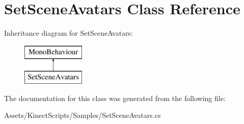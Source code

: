 \hypertarget{class_set_scene_avatars}{}\section{Set\+Scene\+Avatars Class Reference}
\label{class_set_scene_avatars}
Inheritance diagram for Set\+Scene\+Avatars\+:\begin{figure}[H]
\begin{center}
\leavevmode
\includegraphics[height=2.000000cm]{class_set_scene_avatars}
\end{center}
\end{figure}


The documentation for this class was generated from the following file\+:\begin{DoxyCompactItemize}
\item 
Assets/\+Kinect\+Scripts/\+Samples/Set\+Scene\+Avatars.\+cs\end{DoxyCompactItemize}
